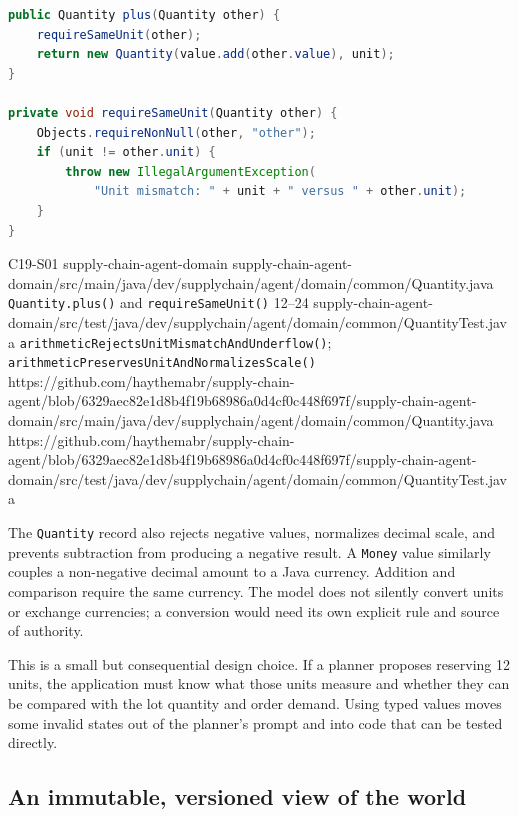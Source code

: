 \begin{minipage}{\linewidth}
\begin{lstlisting}[language=Java,caption={Quantity arithmetic rejects operations across different units (Source C19-S01).},label={lst:ch19-quantity}]
public Quantity plus(Quantity other) {
    requireSameUnit(other);
    return new Quantity(value.add(other.value), unit);
}

private void requireSameUnit(Quantity other) {
    Objects.requireNonNull(other, "other");
    if (unit != other.unit) {
        throw new IllegalArgumentException(
            "Unit mismatch: " + unit + " versus " + other.unit);
    }
}
\end{lstlisting}

\BookSourceReferenceNoQR
  {C19-S01}
  {supply-chain-agent-domain}
  {supply-chain-agent-domain/src/main/java/dev/supplychain/agent/domain/common/Quantity.java}
  {\texttt{Quantity.plus()} and \texttt{requireSameUnit()}}
  {12--24}
  {supply-chain-agent-domain/src/test/java/dev/supplychain/agent/domain/common/QuantityTest.java}
  {\texttt{arithmeticRejectsUnitMismatchAndUnderflow()}; \texttt{arithmeticPreservesUnitAndNormalizesScale()}}
  {https://github.com/haythemabr/supply-chain-agent/blob/6329aec82e1d8b4f19b68986a0d4cf0c448f697f/supply-chain-agent-domain/src/main/java/dev/supplychain/agent/domain/common/Quantity.java}
  {https://github.com/haythemabr/supply-chain-agent/blob/6329aec82e1d8b4f19b68986a0d4cf0c448f697f/supply-chain-agent-domain/src/test/java/dev/supplychain/agent/domain/common/QuantityTest.java}
\end{minipage}

The \texttt{Quantity} record also rejects negative values, normalizes decimal scale, and prevents subtraction from producing a negative result. A \texttt{Money} value similarly couples a non-negative decimal amount to a Java currency. Addition and comparison require the same currency. The model does not silently convert units or exchange currencies; a conversion would need its own explicit rule and source of authority.

This is a small but consequential design choice. If a planner proposes reserving 12 units, the application must know what those units measure and whether they can be compared with the lot quantity and order demand. Using typed values moves some invalid states out of the planner's prompt and into code that can be tested directly.

\subsection{An immutable, versioned view of the world}

